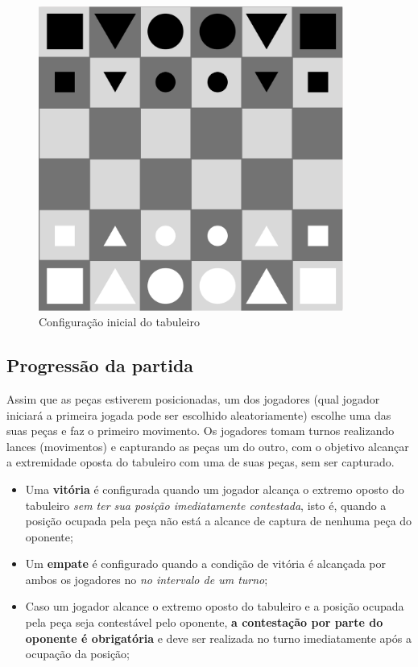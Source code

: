 \begin{figure}[h]
    \centering
    \includegraphics[width=10cm]{Images/figure_1_board_setup}
    \caption{Configuração inicial do tabuleiro}
    \label{fig:configuracao tabuleiro}
\end{figure}

\subsection{Progressão da partida}
Assim que as peças estiverem posicionadas, um dos jogadores (qual jogador iniciará a primeira jogada pode ser escolhido
aleatoriamente) escolhe uma das suas peças e faz o primeiro movimento. Os jogadores tomam turnos realizando lances
(movimentos) e capturando as peças um do outro, com o objetivo alcançar a extremidade oposta do tabuleiro com uma de suas
peças, sem ser capturado.

\begin{itemize}
  \item Uma \textbf{vitória} é configurada quando um jogador alcança o extremo oposto do tabuleiro \textit{sem ter sua
    posição imediatamente contestada}, isto é, quando a posição ocupada pela peça não está a alcance de captura de
    nenhuma peça do oponente;
  \item Um \textbf{empate} é configurado quando a condição de vitória é alcançada por ambos os jogadores no \textit{no
    intervalo de um turno};
  \item Caso um jogador alcance o extremo oposto do tabuleiro e a posição ocupada pela peça seja contestável pelo
    oponente, \textbf{a contestação por parte do oponente é obrigatória} e deve ser realizada no turno imediatamente
    após a ocupação da posição;
\end{itemize}


